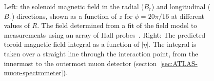 \begin{figure}[htbp]
	\centering
	\hfill
	\caption{Left: the solenoid magnetic field in the radial ($B_r$) and longitudinal ($B_z$) directions, shown as a function of $z$ for $\phi=20\pi/16$ at different values of $R$. The field determined from a fit of the field model to measurements using an array of Hall probes~\cite{Aleksa:2008br}. Right: The predicted toroid magnetic field integral as a function of $|\eta|$. The integral is taken over a straight line through the interaction point, from the innermost to the outermost muon detector (section~\ref{sec:ATLAS-muon-spectrometer}).}
	\label{fig:ATLAS-magnets-Bfield}
\end{figure}


